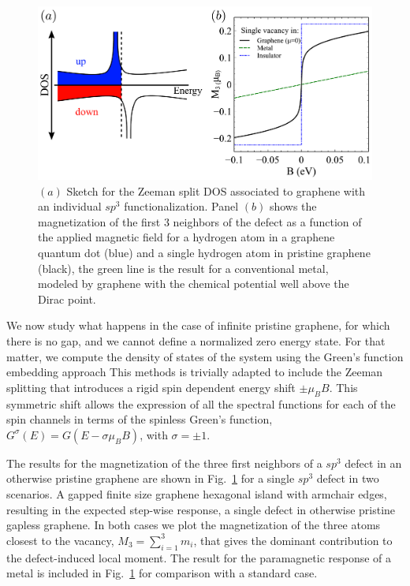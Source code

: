 \begin{figure}[t!]
  \centering
  \includegraphics{defects/fig/comparison.pdf}
  \caption{$(a)$ Sketch for the Zeeman split  DOS associated to  graphene with an individual $sp^3$ functionalization. Panel $(b)$ shows the magnetization of the first 3 neighbors of the defect as a function of the applied magnetic field for a hydrogen atom in a graphene quantum dot (blue) and a single hydrogen atom in pristine graphene (black), the green line is the result for a conventional metal, modeled by graphene with the chemical potential well above the Dirac point.}
  \label{mb}
\end{figure}
We now study what happens in the case of infinite pristine graphene, for which there is no gap, and we cannot define a normalized zero energy state. For that matter, we compute the density of states of the system using the Green's function embedding approach %
This methods is trivially adapted to include the Zeeman splitting that introduces a rigid spin dependent energy shift $\pm\mu_B B$. This symmetric shift allows the expression of all the spectral functions for each of the spin channels in terms of the spinless Green's function, $G^\sigma(E)=G(E-\sigma \mu_BB)$, with $\sigma= \pm 1$.


The results for the magnetization of the three first neighbors of a $sp^3$ defect in an otherwise pristine graphene are shown in Fig.~\ref{mb} for a single $sp^3$ defect in two scenarios. A gapped finite size graphene hexagonal island with armchair edges, resulting in the expected step-wise response, a single defect in otherwise pristine gapless graphene.
In both cases we plot  the magnetization of the three atoms closest to the vacancy,
$M_3=\sum^3_{i=1}m_i$, that gives the dominant contribution to the
defect-induced local moment. {The result for the paramagnetic response of a
metal is included in Fig.~\ref{mb} for comparison with a standard case}.

